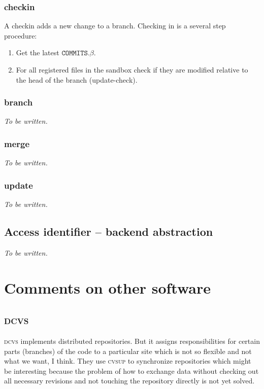 \documentclass[fleqn, 10pt, a4paper]{article}
\begin{document}
\subsubsection{checkin}

A checkin adds a new change to a branch. Checking in is a
several step procedure:

\begin{enumerate}
\item Get the latest $\mathtt{COMMITS.}\beta$.
\item For all registered files in the sandbox check
if they are modified relative to the head of the branch
(\textsf{update-check}).
\end{enumerate}


\subsubsection{branch}
\emph{To be written.}

\subsubsection{merge}
\emph{To be written.}

\subsubsection{update}
\emph{To be written.}

\subsection{Access identifier -- backend abstraction}
\emph{To be written.}


\section{Comments on other software}

\subsection{\textsc{dcvs}}

\textsc{dcvs} implements distributed repositories. But it assigns
responsibilities for certain parts (branches) of the code to
a particular site which is not so flexible and not what we want, I think.
They use \textsc{cvsup} to synchronize repositories which might be
interesting because the problem of how to exchange data without checking
out all necessary revisions and not touching the repository directly is
not yet solved.
 
\end{document}
